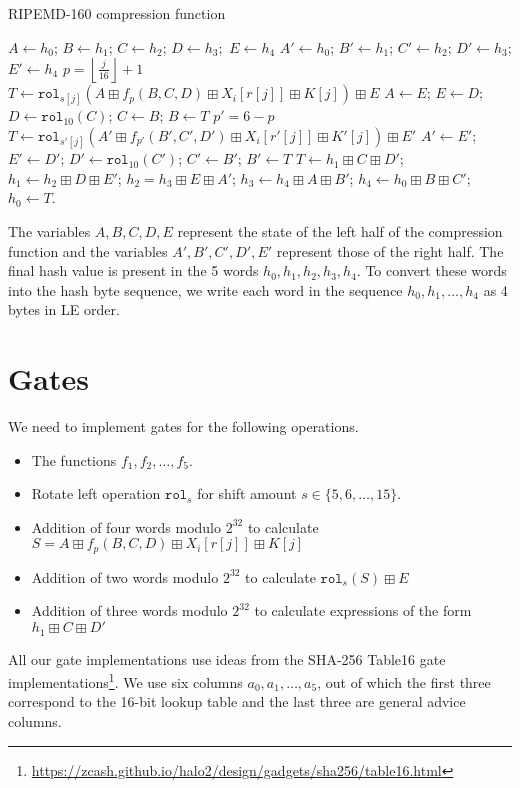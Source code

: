 \documentclass[10pt]{article}
\begin{document}
\begin{algorithm}
  \caption{RIPEMD-160 compression function}
  \begin{algorithmic}
    \State $A \gets h_0$; $B \gets h_1$; $C \gets h_2$; $D \gets h_{3};$ $E \gets h_4$
    \State $A' \gets h_0$; $B' \gets h_1$; $C' \gets h_2$; $D' \gets h_3$; $E' \gets h_4$
    \State $p = \left\lfloor \frac{j}{16}  \right\rfloor + 1$ 
    \State $T \gets \texttt{rol}_{s[j]} \left( A \boxplus f_p(B, C, D) \boxplus X_i[r[j]] \boxplus K[j]\right) \boxplus E$
    \State $A \gets E$; $E \gets D$; $D \gets \texttt{rol}_{10}(C)$; $C \gets B$; $B \gets T$
    \State $p' = 6-p$
    \State $T \gets \texttt{rol}_{s'[j]} \left( A' \boxplus f_{p'}(B', C', D') \boxplus X_i[r'[j]] \boxplus K'[j]\right) \boxplus E'$
    \State $A' \gets E'$; $E' \gets D'$; $D' \gets \texttt{rol}_{10}(C')$; $C' \gets B'$; $B' \gets T$
    \EndFor
    \State $T \gets h_1 \boxplus C \boxplus D'$; $h_1 \gets h_2 \boxplus D \boxplus E'$; $h_2 = h_3 \boxplus E \boxplus A'$;
    \State $h_3 \gets h_4 \boxplus A \boxplus B'$; $h_4 \gets h_0 \boxplus B \boxplus C'$; $h_0 \gets T$.
  \EndFor
  \end{algorithmic}
\end{algorithm}

The variables $A,B,C,D,E$ represent the state of the left half of the compression function and the variables $A',B',C',D',E'$ represent those of the right half. The final hash value is present in the 5 words $h_0, h_1, h_2, h_3, h_4$. To convert these words into the hash byte sequence, we write each word in the sequence $h_0,h_1,\ldots,h_4$ as 4 bytes in LE order.

\section{Gates}%
\label{sec:gates}
We need to implement gates for the following operations.
\begin{itemize}
  \item The functions $f_1, f_2, \ldots, f_5$.
  \item Rotate left operation $\texttt{rol}_s$ for shift amount $s \in \{5,6,\ldots,15\}$.
  \item Addition of four words modulo $2^{32}$ to calculate $S = A \boxplus f_p(B, C, D) \boxplus X_i[r[j]] \boxplus K[j]$
  \item Addition of two words modulo $2^{32}$ to calculate $\texttt{rol}_s(S) \boxplus E$
  \item Addition of three words modulo $2^{32}$ to calculate expressions of the form $h_1 \boxplus C \boxplus D'$
\end{itemize}
All our gate implementations use ideas from the SHA-256 Table16 gate implementations\footnote{\url{https://zcash.github.io/halo2/design/gadgets/sha256/table16.html}}. We use six columns $a_0, a_1, \ldots, a_5$, out of which the first three correspond to the 16-bit lookup table and the last three are general advice columns.
\end{document}

